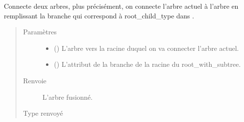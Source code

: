 \documentclass[letterpaper,10pt,french]{sphinxmanual}
\begin{document}
\begin{fulllineitems}
\begin{fulllineitems}
\begin{quote}
\begin{description}
\end{description}\end{quote}

\end{fulllineitems}


\begin{fulllineitems}
\label{\detokenize{index:StrategyTree.StrategyTree.connect}}
Connecte deux arbres, plus précisément, on connecte l’arbre actuel à
l’arbre  en remplissant la branche qui correspond à
root\_child\_type dans .
\begin{quote}\begin{description}
\item[{Paramètres}] \leavevmode\begin{itemize}
\item {} 
 ({\hyperref[\detokenize{index:StrategyTree.StrategyTree}]{}}) \textendash{} L’arbre vers la racine duquel on va connecter l’arbre actuel.

\item {} 
 () \textendash{} L’attribut de la branche de la racine du root\_with\_subtree.

\end{itemize}

\item[{Renvoie}] \leavevmode
{} \textendash{} L’arbre fusionné.

\item[{Type renvoyé}] \leavevmode
{\hyperref[\detokenize{index:StrategyTree.StrategyTree}]{}}

\end{description}\end{quote}

\end{fulllineitems}



\end{fulllineitems}
\end{document}
